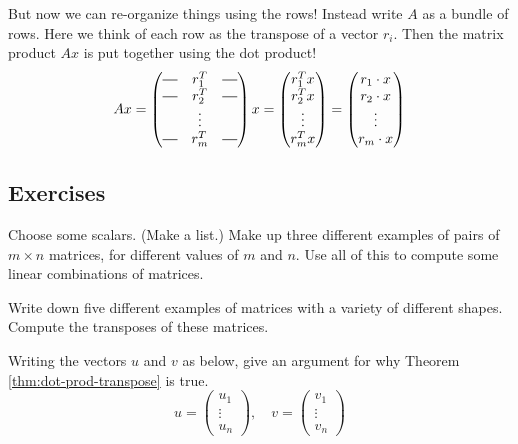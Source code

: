\documentclass[elementsmain.tex]{subfiles}
\begin{document}
But now we can re-organize things using the rows! Instead write $A$ as a bundle of rows. Here we think of each row as the transpose of a vector $r_i$. Then the matrix product $Ax$ is put together using the dot product!
\[
Ax  = \begin{pmatrix} \horzbar & r_1^T & \horzbar \\ \horzbar &  r_2^T & \horzbar \\ & \vdots & \\ \horzbar & r_m^T & \horzbar \end{pmatrix} x 
 = \begin{pmatrix} r_1^T x \\ r_2^T x \\ \vdots \\ r_m^T x \end{pmatrix} 
  = \begin{pmatrix} r_1\cdot x \\ r_2\cdot x \\ \vdots \\ r_m\cdot x \end{pmatrix}
\]



\clearpage
\subsection*{Exercises}

\begin{exercise} Choose some scalars. (Make a list.) Make up three different examples of pairs of $m\times n$ matrices, for different values of $m$ and $n$. Use all of this to compute some linear combinations of matrices.
\end{exercise}

\begin{exercise} Write down five different examples of matrices with a variety of different shapes. Compute the transposes of these matrices.
\end{exercise}


\begin{exercise}
Writing the vectors $u$ and $v$ as below, give an argument for why Theorem \ref{thm:dot-prod-transpose} is true.
\[
u = \begin{pmatrix} u_1 \\ \vdots \\ u_n \end{pmatrix}, \quad 
v = \begin{pmatrix} v_1 \\ \vdots \\ v_n \end{pmatrix}
\]
\end{exercise}
\end{document}
